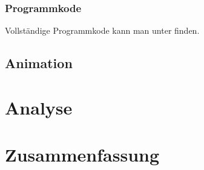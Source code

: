 \documentclass[a4paper,12pt]{llncs}
\numberwithin{equation}{section}
\begin{document}
\subsubsection{Programmkode}
Vollständige Programmkode kann man unter \cite{source} finden.
\subsection{Animation}\label{subs:vis:anime}

\fi
\section{Analyse}\label{sec:analy}

\fi
\section{Zusammenfassung}

\fi
\newpage

 

\end{document}
